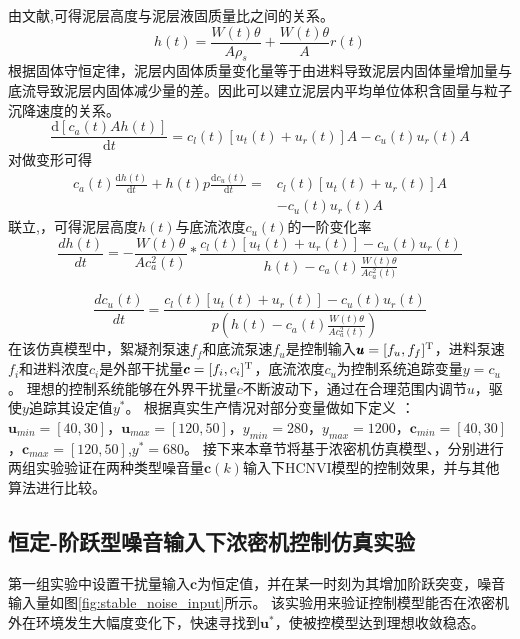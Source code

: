由文献\cite{Tang2009},可得泥层高度与泥层液固质量比之间的关系。
 \begin{equation}
 \label{equ:H_ca}
h(t)=\frac{W(t) \theta}{A \rho_{s}}+\frac{W(t) \theta}{A}r(t)
\end{equation}
根据固体守恒定律，泥层内固体质量变化量等于由进料导致泥层内固体量增加量与底流导致泥层内固体减少量的差。因此可以建立泥层内平均单位体积含固量与粒子沉降速度的关系。
\begin{equation}
\label{equ:mass_balance} \frac{\mathrm{d}\left[c_{a}(t) A
h(t)\right]}{\mathrm{d} t}=c_{l}(t)\left[u_{t}(t)+u_{r}(t)\right]
A-c_{u}(t) u_{r}(t) A
\end{equation}
对做变形可得
\begin{equation}
\label{equ:mass_thickener_formula}
\begin{aligned}
c_{a}(t) \frac{\mathrm{d} h(t)}{\mathrm{d} t}+h(t) p
\frac{\mathrm{d} c_{u}(t)}{\mathrm{d} t}=
&c_{l}(t)\left[u_{t}(t)+u_{r}(t)\right] A \\ &-c_{u}(t) u_{r}(t) A
\end{aligned}
\end{equation}
联立,，可得泥层高度$h(t)$与底流浓度$c_u(t)$的一阶变化率
\begin{equation}
\label{equ:dh_dt} \frac{d h(t)}{d t}=-\frac{W(t) \theta}{A
c_{a}^{2}(t)}*\frac{ c_{l}(t)\left[u_{t}(t)+u_{r}(t)\right]-c_{u}(t)
u_{r}(t)}{h(t)-c_{a}(t) \frac{W(t) \theta}{A c_{a}^{2}(t)}}
\end{equation}

\begin{equation}
\label{equ:du_dt} \frac{d c_{u}(t)}{d
t}=\frac{c_{l}(t)\left[u_{t}(t)+u_{r}(t)\right]-c_{u}(t)
u_{r}(t)}{p(h(t)-c_{a}(t) \frac{W(t) \theta}{A c_{a}^{2}(t)})}
\end{equation}
在该仿真模型中，絮凝剂泵速$f_f$和底流泵速$f_u$是控制输入$\pmb
u=[f_u,f_f]^{\rm T}$，进料泵速$f_i$和进料浓度$c_i$是外部干扰量$\pmb
c=[f_i,c_i]^{\rm T}$，底流浓度$c_u$为控制系统追踪变量$y=c_u$。
理想的控制系统能够在外界干扰量$c$不断波动下，通过在合理范围内调节$u$，驱使$y$追踪其设定值$y^*$。
根据真实生产情况对部分变量做如下定义 ：$\pmb u_{min}=[40,30]$，$\pmb
u_{max}=[120,50]$，$y_{min}=280$，$y_{max}=1200$，$\pmb
c_{min}=[40,30]$，$\pmb c_{max}=[120,50]$,$y^*=680$。
接下来本章节将基于浓密机仿真模型、，分别进行两组实验验证在两种类型噪音量$\pmb
c(k)$输入下HCNVI模型的控制效果，并与其他算法进行比较。
\subsection{恒定-阶跃型噪音输入下浓密机控制仿真实验}
\label{sec:vi_hdp_stable} 第一组实验中设置干扰量输入$\pmb
c$为恒定值，并在某一时刻为其增加阶跃突变，噪音输入量如图\ref{fig:stable_noise_input}所示。
该实验用来验证控制模型能否在浓密机外在环境发生大幅度变化下，快速寻找到$\pmb
u^*$，使被控模型达到理想收敛稳态。

